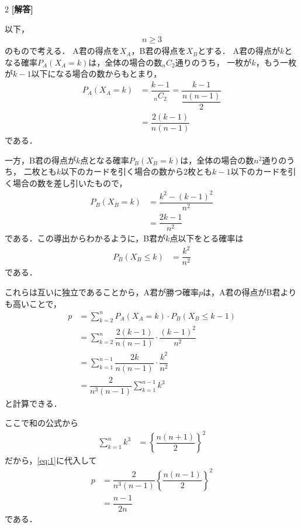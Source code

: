 \documentclass[../../main.tex]{subfiles}
\begin{document}
\setcounter{equation}{0}
\begin{oframed}
  
\end{oframed}
\setlength{\columnseprule}{0.4pt}
\begin{multicols}{2}
  {\bf [解答]}

  以下，
  \begin{align}
    n \ge 3
  \end{align}
  のもので考える．
  A君の得点を$X_A$，B君の得点を$X_B$とする．
  A君の得点が$k$となる確率$P_A(X_A=k)$は，全体の場合の数${}_nC_2$通りのうち，
  一枚が$k$，もう一枚が$k-1$以下になる場合の数からもとまり，
  \begin{align}
    P_A(X_A=k)
    & = \dfrac{k-1}{{}_nC_2} = \dfrac{k-1}{\dfrac{n(n-1)}{2}} \\
    & = \dfrac{2(k-1)}{n(n-1)}
  \end{align}
  である．

  一方，B君の得点が$k$点となる確率$P_B(X_B=k)$は，全体の場合の数$n^2$通りのうち，
  二枚とも$k$以下のカードを引く場合の数から2枚とも$k-1$以下のカードを引く場合の数を差し引いたもので，
  \begin{align}
    P_B(X_B=k)
    & = \dfrac{k^2 - (k-1)^2}{n^2} \\
    & = \dfrac{2k-1}{n^2}
  \end{align}
  である．この導出からわかるように，B君が$k$点以下をとる確率は
  \begin{align}
    P_B(X_B\le k) & = \dfrac{k^2}{n^2}
  \end{align}
  である．

  これらは互いに独立であることから，A君が勝つ確率$p$は，A君の得点がB君よりも高いことで，
  \begin{align}
    p
    & = \sum_{k=2}^n P_A(X_A=k) \cdot P_B(X_B\le k-1)                \\
    & = \sum_{k=2}^n \dfrac{2(k-1)}{n(n-1)} \cdot \dfrac{(k-1)^2}{n^2} \\
    & = \sum_{k=1}^{n-1} \dfrac{2k}{n(n-1)} \cdot \dfrac{k^2}{n^2}     \\
    & = \dfrac{2}{n^3(n-1)}\sum_{k=1}^{n-1} k^3  \label{eq:1}
  \end{align}
  と計算できる．

  ここで和の公式から
  \begin{align}
    \sum_{k=1}^{n} k^3 & = \left\{\dfrac{n(n+1)}{2}\right\}^2
  \end{align}
  だから，\cref{eq:1}に代入して
  \begin{align}
    p
    & = \dfrac{2}{n^3(n-1)} \left\{\dfrac{n(n-1)}{2}\right\}^2 \\
    & = \dfrac{n-1}{2n} \label{eq:2}
  \end{align}
  である．


\end{multicols}
\end{document}
